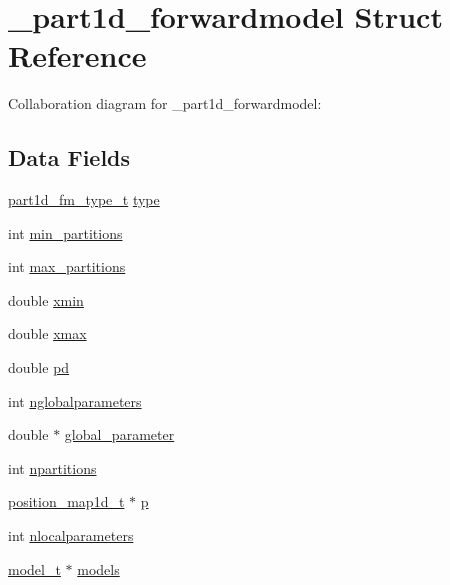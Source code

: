 \hypertarget{struct__part1d__forwardmodel}{}\section{\+\_\+part1d\+\_\+forwardmodel Struct Reference}
\label{struct__part1d__forwardmodel}


Collaboration diagram for \+\_\+part1d\+\_\+forwardmodel\+:
\subsection*{Data Fields}
\begin{DoxyCompactItemize}
\item 
\hyperlink{part1d__forwardmodel_8h_a07f3922b42067c9cb736d872eea155c6}{part1d\+\_\+fm\+\_\+type\+\_\+t} \hyperlink{struct__part1d__forwardmodel_a1131d1d6210a71cae3bad507cf87dfd7}{type}
\item 
int \hyperlink{struct__part1d__forwardmodel_ada490ee1ccf061f81a21051d2e6b4fd0}{min\+\_\+partitions}
\item 
int \hyperlink{struct__part1d__forwardmodel_ab12d44e555fdbd5540d84d3c12e4806c}{max\+\_\+partitions}
\item 
double \hyperlink{struct__part1d__forwardmodel_afc68234aafe3f452ba66be391841a467}{xmin}
\item 
double \hyperlink{struct__part1d__forwardmodel_a559c425f5d734f5fcdfc27bcd51c7a87}{xmax}
\item 
double \hyperlink{struct__part1d__forwardmodel_a0071470483f0ca89c0e7c33f8d1f7ca7}{pd}
\item 
int \hyperlink{struct__part1d__forwardmodel_ab70ef8ed00fc885f9985e1e978a3e02a}{nglobalparameters}
\item 
double $\ast$ \hyperlink{struct__part1d__forwardmodel_af5129b3777d22503d75f5c3442e536c5}{global\+\_\+parameter}
\item 
int \hyperlink{struct__part1d__forwardmodel_ae447d08e8086f98014ecd8f361f0b2e8}{npartitions}
\item 
\hyperlink{position__map1d_8h_aced1bad6e33e2b5679d6d06747735cf6}{position\+\_\+map1d\+\_\+t} $\ast$ \hyperlink{struct__part1d__forwardmodel_a64820eb69c2a4089f3bb45d47b1bcd2e}{p}
\item 
int \hyperlink{struct__part1d__forwardmodel_abe35cde3de29b2efc16d64a2f1ea74d9}{nlocalparameters}
\item 
\hyperlink{part1d__forwardmodel_8c_a0a038e31b1f765296a40c2da07b46a84}{model\+\_\+t} $\ast$ \hyperlink{struct__part1d__forwardmodel_a135ea522c684e646fa2398aaeed0f264}{models}

\end{DoxyCompactItemize}
